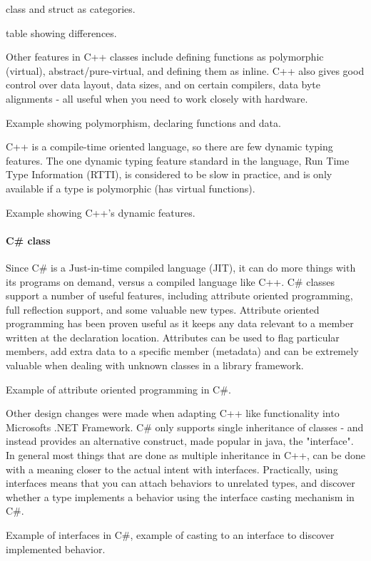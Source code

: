 class and struct as categories.

table showing differences.

Other features in C++ classes include defining functions as polymorphic (virtual), abstract/pure-virtual, and defining them as inline.  C++ also gives good control over data layout, data sizes, and on certain compilers, data byte alignments - all useful when you need to work closely with hardware.

Example showing polymorphism, declaring functions and data.

C++ is a compile-time oriented language, so there are few dynamic typing features.  The one dynamic typing feature
standard in the language, Run Time Type Information (RTTI), is considered to be slow in practice, and is only available if a type is polymorphic (has virtual functions).

Example showing C++'s dynamic features.

\paragraph{C\# class}
Since C\# is a Just-in-time compiled language (JIT), it can do more things with its programs on demand, 
versus a compiled language like C++.  C\# classes support a number of useful features, including
attribute oriented programming, full reflection support, and some valuable new types.  Attribute oriented
programming has been proven useful as it keeps any data relevant to a member written at the declaration location.  Attributes can be used to flag particular members, add extra data to a specific member (metadata) and can be extremely
valuable when dealing with unknown classes in a library framework.

Example of attribute oriented programming in C\#.

Other design changes were made when adapting C++ like functionality into Microsofts .NET Framework.  C\#
only supports single inheritance of classes - and instead provides an alternative construct, made
popular in java, the "interface".  In general most things that are done as multiple inheritance
in C++, can be done with a meaning closer to the actual intent with interfaces.  Practically, using
interfaces means that you can attach behaviors to unrelated types, and discover whether a type implements
a behavior using the interface casting mechanism in C\#.

Example of interfaces in C\#, example of casting to an interface to discover implemented behavior.

